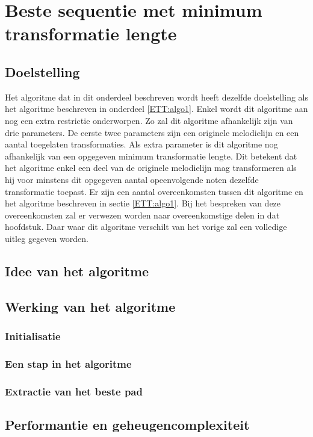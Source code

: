 \section{Beste sequentie met minimum transformatie lengte}
\label{ETT:algo2}

\subsection{Doelstelling}
Het algoritme dat in dit onderdeel beschreven wordt heeft dezelfde doelstelling als het algoritme beschreven in onderdeel \ref{ETT:algo1}. Enkel wordt dit algoritme aan nog een extra restrictie onderworpen. Zo zal dit algoritme afhankelijk zijn van drie parameters. De eerste twee parameters zijn een originele melodielijn en een aantal toegelaten transformaties. Als extra parameter is dit algoritme nog afhankelijk van een opgegeven minimum transformatie lengte. Dit betekent dat het algoritme enkel een deel van de originele melodielijn mag transformeren als hij voor minstens dit opgegeven aantal opeenvolgende noten dezelfde transformatie toepast. Er zijn een aantal overeenkomsten tussen dit algoritme en het algoritme beschreven in sectie \ref{ETT:algo1}. Bij het bespreken van deze overeenkomsten zal er verwezen worden naar overeenkomstige delen in dat hoofdstuk. Daar waar dit algoritme verschilt van het vorige zal een volledige uitleg gegeven worden.

\subsection{Idee van het algoritme}

\subsection{Werking van het algoritme}

\subsubsection{Initialisatie}
\subsubsection{Een stap in het algoritme}
\subsubsection{Extractie van het beste pad}

\subsection{Performantie en geheugencomplexiteit}

